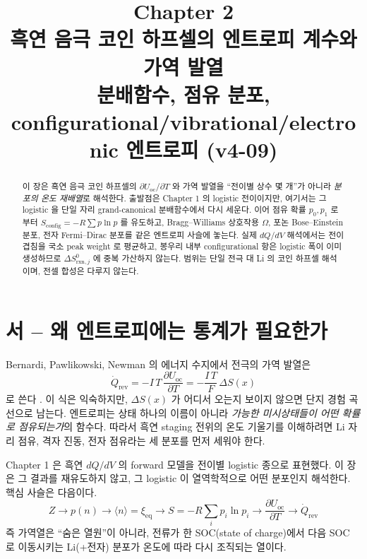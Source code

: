 \documentclass[11pt,a4paper]{article}
\title{\textbf{\LARGE Chapter 2}\\[0.35em]
\Large 흑연 음극 코인 하프셀의 엔트로피 계수와 가역 발열\\[0.2em]
\large 분배함수, 점유 분포, configurational/vibrational/electronic 엔트로피 (v4-09)}
\author{}\date{}
\newcommand{\rxn}{\mathrm{rxn}}
\newcommand{\eq}{\mathrm{eq}}
\newcommand{\rev}{\mathrm{rev}}
\newcommand{\oc}{\mathrm{oc}}
\newcommand{\conf}{\mathrm{config}}
\begin{document}
\maketitle

\begin{abstract}
이 장은 흑연 음극 코인 하프셀의 $\partial U_\oc/\partial T$ 와 가역 발열을
``전이별 상수 몇 개''가 아니라 \emph{분포의 온도 재배열}로 해석한다. 출발점은
Chapter 1 의 logistic 전이이지만, 여기서는 그 logistic 을 단일 자리 grand-canonical
분배함수에서 다시 세운다. 이어 점유 확률 $p_0,p_1$ 로부터
$S_\conf=-R\sum p\ln p$ 를 유도하고, Bragg--Williams 상호작용 $\Omega$,
포논 Bose--Einstein 분포, 전자 Fermi--Dirac 분포를 같은 엔트로피 사슬에 놓는다.
실제 $dQ/dV$ 해석에서는 전이 겹침을 국소 peak weight 로 평균하고, 봉우리 내부
configurational 항은 logistic 폭이 이미 생성하므로 $\Delta S^0_{\rxn,j}$ 에 중복
가산하지 않는다. 범위는 단일 전극 대 Li 의 코인 하프셀 해석이며, 전셀 합성은
다루지 않는다.
\end{abstract}

\tableofcontents
\newpage

\section*{서 -- 왜 엔트로피에는 통계가 필요한가}
Bernardi, Pawlikowski, Newman 의 에너지 수지에서 전극의 가역 발열은
\begin{equation}
\dot Q_\rev=-I\,T\,\frac{\partial U_\oc}{\partial T}
=-\frac{I\,T}{F}\,\Delta S(x)
\label{eq:qrev_intro}
\end{equation}
로 쓴다 \cite{bernardi1985,newman}. 이 식은 익숙하지만, $\Delta S(x)$ 가 어디서
오는지 보이지 않으면 단지 경험 곡선으로 남는다. 엔트로피는 상태 하나의 이름이
아니라 \emph{가능한 미시상태들이 어떤 확률로 점유되는가}의 함수다. 따라서
흑연 staging 전위의 온도 기울기를 이해하려면 Li 자리 점유, 격자 진동, 전자
점유라는 세 분포를 먼저 세워야 한다.

Chapter 1 은 흑연 $dQ/dV$ 의 forward 모델을 전이별 logistic 종으로 표현했다. 이 장은
그 결과를 재유도하지 않고, 그 logistic 이 열역학적으로 어떤 분포인지 해석한다.
핵심 사슬은 다음이다.
\begin{equation}
\boxed{\;
Z \longrightarrow p(n) \longrightarrow \langle n\rangle=\xi_\eq
\longrightarrow S=-R\sum_i p_i\ln p_i
\longrightarrow \frac{\partial U_\oc}{\partial T}
\longrightarrow \dot Q_\rev
\;}
\label{eq:spine}
\end{equation}
즉 가역열은 ``숨은 열원''이 아니라, 전류가 한 SOC(state of charge)에서 다음 SOC 로
이동시키는 Li(+전자) 분포가 온도에 따라 다시 조직되는 열이다.
\end{document}
